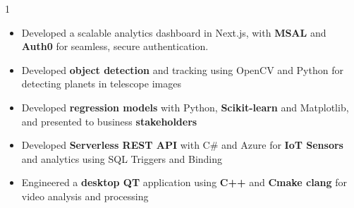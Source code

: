 \documentclass[11pt,a4paper,ragged2e]{altacv}
\begin{document}
\begin{paracol}{1}
\begin{itemize}
\item Developed a scalable analytics dashboard in Next.js, with \textbf{MSAL} and \textbf{Auth0} for seamless, secure authentication.
\item Developed \textbf{object detection} and tracking using OpenCV and Python for detecting planets in telescope images
\item Developed \textbf{regression models} with Python, \textbf{Scikit-learn} and Matplotlib, and presented to business \textbf{stakeholders}
\item Developed \textbf{Serverless REST API} with C\# and Azure for \textbf{IoT Sensors} and analytics using SQL Triggers and Binding
\item Engineered a \textbf{desktop QT} application using \textbf{C++} and \textbf{Cmake clang} for video analysis and processing
\end{itemize}
\tightdivider


\end{paracol}
\end{document}
